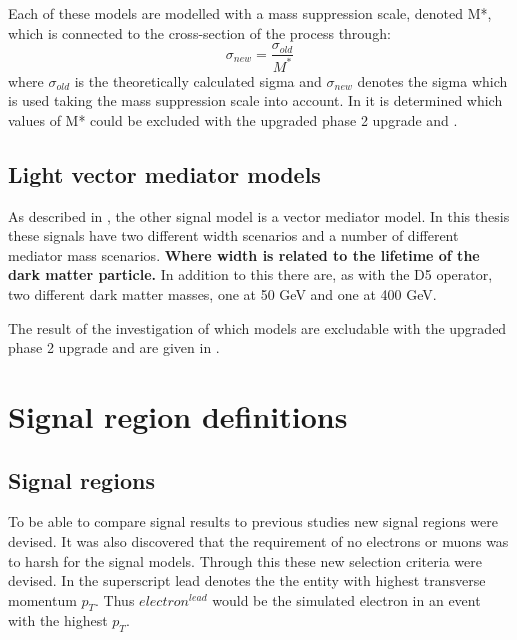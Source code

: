 Each of these models are modelled with a mass suppression scale, denoted M*, which is connected to the cross-section of the process through:
\begin{equation}
\sigma_{new} = \frac{\sigma_{old}}{M^*} 
\end{equation}
where $\sigma_{old}$ is the theoretically calculated sigma and $\sigma_{new}$ denotes the sigma which is used taking the mass suppression scale into account.
In  it is determined which values of M* could be excluded with the upgraded \abbrLHC phase 2 upgrade and \abbrATLAS .

\subsection{Light vector mediator models}\label{sec:signal:subsec:vecmed}
As described in , the other signal model is a vector mediator model. In this thesis these signals have two different width scenarios and a number of different mediator mass scenarios. \textbf{Where width is related to the lifetime of the dark matter particle.} In addition to this there are, as with the D5 operator, two different dark matter masses, one at 50 GeV and one at 400 GeV.

The result of the investigation of which models are excludable with the upgraded \abbrLHC phase 2 upgrade and \abbrATLAS are given in . 
 
\newpage
\section{Signal region definitions}
\subsection{Signal regions}
To be able to compare signal results to previous studies new signal regions were devised. It was also discovered that the requirement of no electrons or muons was to harsh for the signal models. Through this these new selection criteria were devised. In  the superscript lead denotes the the entity with highest transverse momentum $p_T$. Thus $electron^{lead}$ would be the simulated electron in an event with the highest $p_T$.

